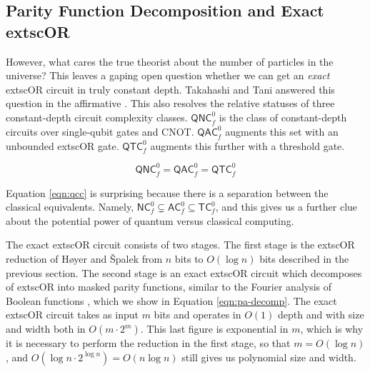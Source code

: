 
\subsection{Parity Function Decomposition and Exact 	extsc{OR}}

However, what cares the true theorist about the number of particles in the
universe? This leaves
a gaping open question whether we can get an \emph{exact} 	extsc{OR} circuit in truly
constant depth. Takahashi and Tani answered this question in the
affirmative \cite{Takahashi2011}.
This also resolves the relative statuses of
three constant-depth circuit complexity classes. $\textsf{QNC}^0_f$ is the
class of constant-depth circuits over single-qubit gates and CNOT.
$\textsf{QAC}^0_f$ augments this set with an unbounded 	extsc{OR} gate.
$\textsf{QTC}^0_f$ augments this further with a threshold gate.

\begin{equation}
\label{eqn:qcc}
\textsf{QNC}_f^0 = \textsf{QAC}_f^0 = \textsf{QTC}_f^0
\end{equation}

Equation \ref{eqn:qcc} is surprising because there is a separation between
the classical equivalents.
Namely, $\textsf{NC}^0_f \subsetneq \textsf{AC}^0_f \subseteq \textsf{TC}^0_f$,
and this gives us a further clue about the potential power of quantum
versus classical computing.

The exact 	extsc{OR} circuit consists of two stages. The first stage is the 	extsc{OR}
reduction of H{\o}yer and {\v S}palek from $n$ bits to $O(\log n)$ bits
described in the previous section.
The second stage is an exact 	extsc{OR} circuit which 
decomposes of 	extsc{OR} into masked parity functions,
similar to the Fourier analysis of Boolean functions \cite{ODonnell2008},
which we show in Equation \ref{eqn:pa-decomp}.
The exact 	extsc{OR} circuit takes as input $m$ bits and operates in
$O(1)$ depth and with
size and width both in $O(m\cdot2^m)$. This last figure is exponential in $m$,
which is why it is necessary to perform the reduction in the first stage,
so that $m = O(\log n)$, and $O(\log n \cdot 2^{\log n}) = O(n \log n)$ still
gives us polynomial size and width.

